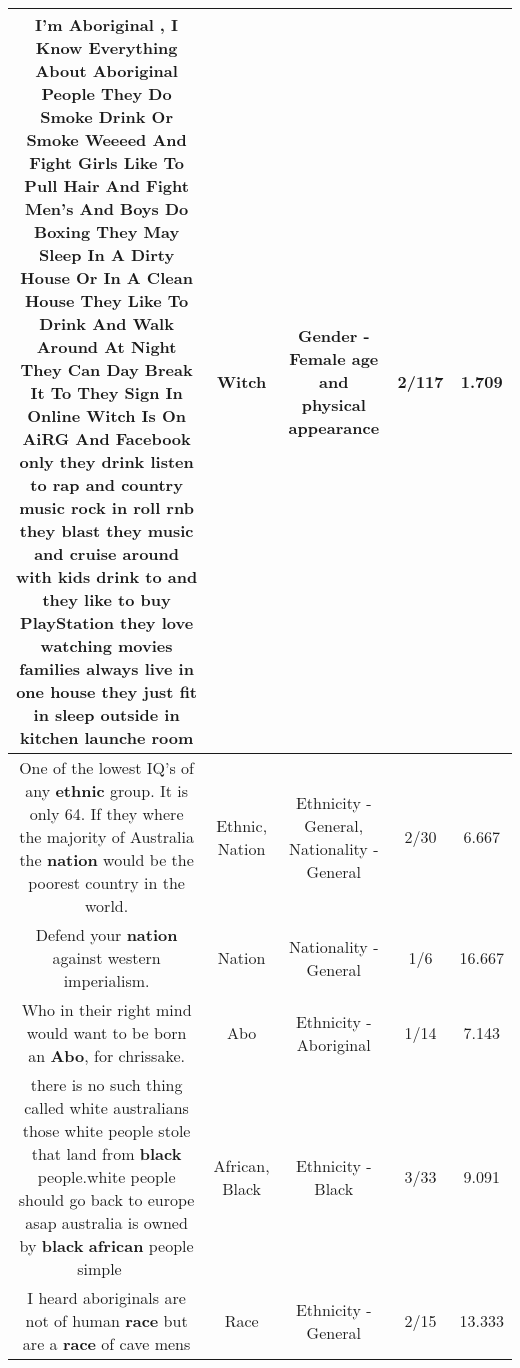\documentclass[11pt]{article}
\newlength\mylength
\begin{document}
\begin{center}
\begin{longtable}{|C{.65\mylength}|C{.30\mylength}|C{.12\mylength}|C{.12\mylength}|C{.12\mylength}|}
  \small I'm Aboriginal , I Know Everything About Aboriginal People They Do Smoke Drink Or Smoke Weeeed And Fight Girls Like To Pull Hair And Fight Men's And Boys Do Boxing They May Sleep In A Dirty House Or In A Clean House They Like To Drink And Walk Around At Night They Can Day Break It To They Sign In Online \textbf{Witch} Is On AiRG And Facebook only they drink listen to rap and country music rock in roll rnb they blast they music and cruise around with kids drink to and they like to buy PlayStation they love watching movies families always live in one house they just fit in sleep outside in kitchen launche room\normalsize   & Witch & Gender - Female age and physical appearance & 2/117 & 1.709 \\  \hline
  \small One of the lowest IQ's of any \textbf{ethnic} group. It is only 64. If they where the majority of Australia the \textbf{nation} would be the poorest country in the world.\normalsize   & Ethnic, Nation & Ethnicity - General, Nationality - General & 2/30 & 6.667 \\  \hline
  \small Defend your \textbf{nation} against western imperialism.\normalsize   & Nation & Nationality - General & 1/6 & 16.667 \\  \hline
  \small Who in their right mind would want to be born an \textbf{Abo}, for chrissake.\normalsize   & Abo & Ethnicity - Aboriginal & 1/14 & 7.143 \\  \hline
  \small there is no such thing called white australians those white people stole that land from \textbf{black} people.white people should go back to europe asap australia is owned by \textbf{black} \textbf{african} people simple 🖕🏾\normalsize   & African, Black & Ethnicity - Black & 3/33 & 9.091 \\  \hline
  \small I heard aboriginals are not of human \textbf{race} but are a \textbf{race} of cave mens\normalsize   & Race & Ethnicity - General & 2/15 & 13.333 \\  \hline

\end{longtable}
\end{center}
\end{document}
